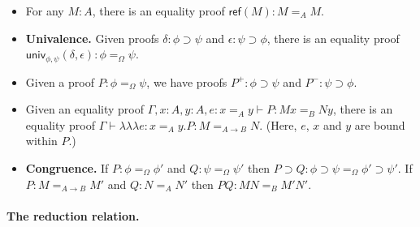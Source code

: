 \documentclass{easychair}
\newcommand{\univ}[4]{\mathsf{univ}_{{#1},{#2}} \left( {#3} , {#4} \right)}
\newcommand{\triplelambda}{\lambda \!\! \lambda \!\! \lambda}
\newcommand{\reff}[1]{\mathsf{ref} \left( {#1} \right)}
\begin{document}
\begin{itemize}
\item
For any $M : A$, there is an equality proof $\reff{M} : M =_A M$.
\item
\textbf{Univalence.}  Given proofs $\delta : \phi \supset \psi$ and $\epsilon : \psi \supset \phi$, there is an equality proof
$\univ{\phi}{\psi}{\delta}{\epsilon} : \phi =_\Omega \psi$.
\item
Given a proof $P : \phi =_\Omega \psi$, we have proofs $P^+ : \phi \supset \psi$ and $P^- : \psi \supset \phi$.
\item
Given an equality proof $\Gamma, x : A, y : A, e : x =_A y \vdash P : Mx =_B Ny$, there is an equality proof $\Gamma \vdash \triplelambda e : x=_Ay . P : M =_{A \rightarrow B} N$.  (Here, $e$, $x$ and $y$ are bound within $P$.)
\item
\textbf{Congruence.}
If $P : \phi =_\Omega \phi'$ and $Q : \psi =_\Omega \psi'$ then $P \supset Q : \phi \supset \psi =_\Omega \phi' \supset \psi'$.  If $P : M =_{A \rightarrow B} M'$ and $Q : N =_A N'$ then $PQ : MN =_B M'N'$.
\end{itemize}

\paragraph{The reduction relation.}
\end{document}
